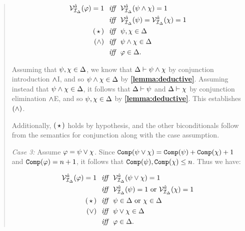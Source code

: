 \begin{quote}
  \vspace{-.2in}
  \begin{align*}
    \mathcal{V}_{\mathcal{I}_{\Delta}}^{\hat{a}}(\varphi)=1 &\textit{ ~iff~ } \mathcal{V}_{\mathcal{I}_{\Delta}}^{\hat{a}}(\psi\wedge\chi)=1\\
      &\textit{ ~iff~ } \mathcal{V}_{\mathcal{I}_{\Delta}}^{\hat{a}}(\psi)=\mathcal{V}_{\mathcal{I}_{\Delta}}^{\hat{a}}(\chi)=1 \\
      (\hspace{1.6pt}\star\hspace{1.6pt}) &\textit{ ~iff~ } \psi,\chi\in\Delta \\
      (\wedge) &\textit{ ~iff~ } \psi\wedge\chi\in\Delta \\
      &\textit{ ~iff~ } \varphi\in\Delta.
  \end{align*}

  Assuming that $\psi,\chi\in\Delta$, we know that $\Delta\vdash\psi\wedge\chi$ by conjunction introduction $\wedge$I, and so $\psi\wedge\chi\in\Delta$ by \textbf{\ref{lemma:deductive}}.
  Assuming instead that $\psi\wedge\chi\in\Delta$, it follows that $\Delta\vdash\psi$ and $\Delta\vdash\chi$ by conjunction elimination $\wedge$E, and so $\psi,\chi\in\Delta$ by \textbf{\ref{lemma:deductive}}.
  This establishes $(\wedge)$.

  Additionally, $(\hspace{1.6pt}\star\hspace{1.6pt})$ holds by hypothesis, and the other biconditionals follow from the semantics for conjunction along with the case assumption.


  \textit{Case 3:}
  Assume $\varphi=\psi\vee\chi$.
  Since $\texttt{Comp}(\psi\vee\chi)=\texttt{Comp}(\psi)+\texttt{Comp}(\chi)+1$ and  $\texttt{Comp}(\varphi)=n+1$, it follows that $\texttt{Comp}(\psi),\texttt{Comp}(\chi)\leq n$.
  Thus we have:

  \vspace{-.2in}
  \begin{align*}
    \mathcal{V}_{\mathcal{I}_{\Delta}}^{\hat{a}}(\varphi)=1 &\textit{ ~iff~ } \mathcal{V}_{\mathcal{I}_{\Delta}}^{\hat{a}}(\psi\vee\chi)=1\\
      &\textit{ ~iff~ } \mathcal{V}_{\mathcal{I}_{\Delta}}^{\hat{a}}(\psi)=1 \text{ or } \mathcal{V}_{\mathcal{I}_{\Delta}}^{\hat{a}}(\chi)=1 \\
      (\hspace{1.6pt}\star\hspace{1.6pt}) &\textit{ ~iff~ } \psi\in\Delta \text{ or } \chi\in\Delta \\
      (\vee) &\textit{ ~iff~ } \psi\vee\chi\in\Delta \\
      &\textit{ ~iff~ } \varphi\in\Delta.
  \end{align*}


\end{quote}
